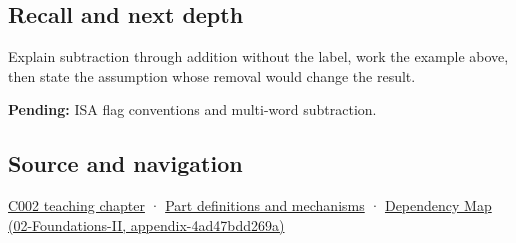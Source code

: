 \subsection{Recall and next depth}\label{recall-and-next-depth}

Explain subtraction through addition without the label, work the example above, then state the assumption whose removal would change the result.

\textbf{Pending:} ISA flag conventions and multi-word subtraction.

\subsection{Source and navigation}\label{source-and-navigation}

\href{Continuous\%20Notes/Computing\%20Foundations\%20-\%20From\%20Bits\%20to\%20C++\%20and\%20Systems\%20APIs\#Arithmetic\%20becomes\%20a\%20policy}{C002 teaching chapter} · \hyperref[appendix-fd090d982a15]{Part definitions and mechanisms} · \href{}{Dependency Map (02-Foundations-II, appendix-4ad47bdd269a)}
